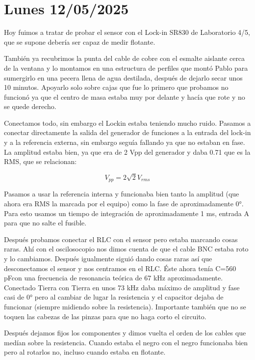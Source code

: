 \section{Lunes 12/05/2025}
Hoy fuimos a tratar de probar el sensor con el Lock-in SR830 de Laboratorio 4/5, que se supone debería ser capaz de medir flotante. 

También ya recubrimos la punta del cable de cobre con el esmalte aislante cerca de la ventana y lo montamos en una estructura de perfiles que montó Pablo para sumergirlo en una pecera llena de agua destilada, después de dejarlo secar unos 10 minutos. Apoyarlo solo sobre cajas que fue lo primero que probamos no funcionó ya que el centro de masa estaba muy por delante y hacía que rote y no se quede derecho. 

Conectamos todo, sin embargo el Lockin estaba teniendo mucho ruido. Pasamos a conectar directamente la salida del generador de funciones a la entrada del lock-in y a la referencia externa, sin embargo seguía fallando ya que no estaban en fase. La amplitud estaba bien, ya que era de 2 Vpp del generador y daba 0.71 que es la RMS, que se relacionan:

\begin{equation}
	V_{pp} = 2\sqrt{2} V_{rms} %
\end{equation} 

Pasamos a usar la referencia interna y funcionaba bien tanto la amplitud (que ahora era RMS la marcada por el equipo) como la fase de aproximadamente 0°. Para esto usamos un tiempo de integración de aproximadamente 1 ms, entrada A para que no salte el fusible. %

Después probamos conectar el RLC con el sensor pero estaba marcando cosas raras. Ahí con el oscilosocopio nos dimos cuenta de que el cable BNC estaba roto y lo cambiamos. Después igualmente siguió dando cosas raras así que desconectamos el sensor y nos centramos en el RLC. Éste ahora tenía C=560 pFcon una frecuencia de resonancia teórica de 67 kHz aproximadamente. Conectado Tierra con Tierra en unos 73 kHz daba máximo de amplitud y fase casi de 0° pero al cambiar de lugar la resistencia y el capacitor dejaba de funcionar (siempre midiendo sobre la resistencia).  Importante también que no se toquen las cabezas de las pinzas para que no haga corto el circuito. %

Después dejamos fijos los componentes y dimos vuelta el orden de los cables que medían sobre la resistencia. Cuando estaba el negro con el negro funcionaba bien pero al rotarlos no, incluso cuando estaba en flotante. 

